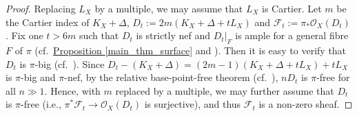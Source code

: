 \begin{proof}
Replacing $L_X$ by a multiple, we may assume that $L_X$ is Cartier.
Let $m$ be the Cartier index of $K_X+\Delta$, $D_t:=2m(K_X+\Delta+tL_X)$ and $\mathcal{F}_t:=\pi_*\mathcal{O}_X(D_t)$. 
Fix one $t>6m$ such that $D_t$ is strictly nef and  $D_t|_{F}$ is ample for a general fibre $F$ of $\pi$ (cf.~{\hyperref[main_thm_surface]{Proposition \ref*{main_thm_surface}}} and \cite[Theorem 1.37]{KM98}). 
Then it is easy to verify that $D_t$ is $\pi$-big  (cf.~\cite[Definition 3.22]{KM98}). 
Since $D_t-(K_X+\Delta)=(2m-1)(K_X+\Delta+tL_X)+tL_X$ is  $\pi$-big and $\pi$-nef, by the relative base-point-free theorem (cf.~\cite[Theorem 3.24]{KM98}), $nD_t$ is $\pi$-free  for all $n\gg 1$.
Hence, with $m$ replaced by a multiple, we may further assume that $D_t$ is $\pi$-free (i.e., $\pi^*\mathcal{F}_t\to \mathcal{O}_X(D_t)$ is surjective), and thus $\mathcal{F}_t$ is a non-zero sheaf.



\end{proof}
